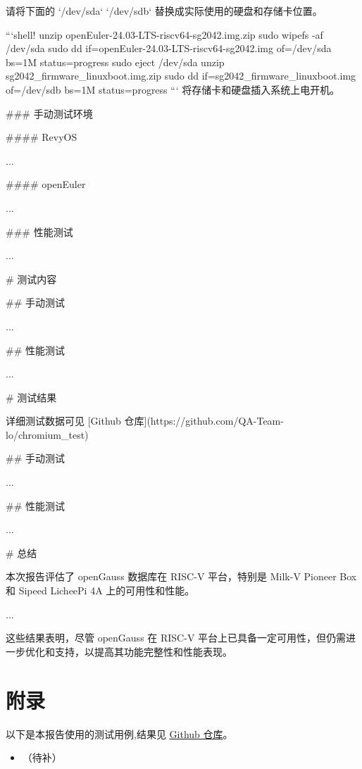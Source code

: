 \documentclass{article}
\begin{document}
\begin{markdown}
请将下面的 `/dev/sda` `/dev/sdb` 替换成实际使用的硬盘和存储卡位置。

```shell!
unzip openEuler-24.03-LTS-riscv64-sg2042.img.zip
sudo wipefs -af /dev/sda
sudo dd if=openEuler-24.03-LTS-riscv64-sg2042.img of=/dev/sda bs=1M status=progress
sudo eject /dev/sda
unzip sg2042_firmware_linuxboot.img.zip
sudo dd if=sg2042_firmware_linuxboot.img of=/dev/sdb bs=1M status=progress
```
将存储卡和硬盘插入系统上电开机。

### 手动测试环境

#### RevyOS

...

#### openEuler

...

### 性能测试

...

# 测试内容

## 手动测试

...

## 性能测试

...

# 测试结果

详细测试数据可见 [Github 仓库](https://github.com/QA-Team-lo/chromium_test)

## 手动测试

...


## 性能测试

...

# 总结

本次报告评估了 openGauss 数据库在 RISC-V 平台，特别是 Milk-V Pioneer Box 和 Sipeed LicheePi 4A 上的可用性和性能。

...

这些结果表明，尽管 openGauss 在 RISC-V 平台上已具备一定可用性，但仍需进一步优化和支持，以提高其功能完整性和性能表现。

\end{markdown}

\newpage
\section{附录}

\appendix

以下是本报告使用的测试用例,结果见 \href{https://github.com/QA-Team-lo/dbtest}{Github 仓库}。

\begin{itemize}
    \item （待补）
\end{itemize}

\end{document}
